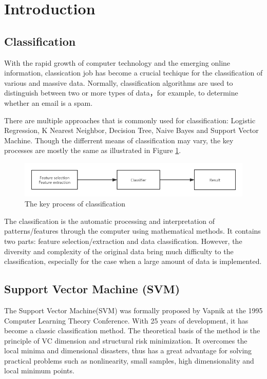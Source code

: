 \section{Introduction}

\subsection{Classification}
With the rapid growth of computer technology and the emerging online information, classication job has become a crucial techique for the classification of various and massive data. Normally, classification algorithms are used to distinguish between two or more types of data，for example, to determine whether an email is a spam. 

There are multiple approaches that is commonly used for classification: Logistic Regression, K Nearest Neighbor, Decision Tree, Naive Bayes and Support Vector Machine. Though the differrent means of classification may vary, the key processes are mostly the same as illustrated in Figure \ref{fig:The key process of classfication}.

\begin{figure}[h!]
    \centering
    \includegraphics[width=\textwidth]{figures/The key process of classfication.png}
    \caption{The key process of classification}
    \label{fig:The key process of classfication}
\end{figure}


The classification is the automatic processing and interpretation of patterns/features through the computer using mathematical methods. It contains two parts: feature selection/extraction and data classification. However, the diversity and complexity of the original data bring much difficulty to the classification, especially for the case when a large amount of data is implemented.

\subsection{Support Vector Machine (SVM)}
The Support Vector Machine(SVM) was formally proposed by Vapnik at the 1995 Computer Learning Theory Conference. With 25 years of development, it has become a classic classification method. The theoretical basis of the method  is the principle of VC dimension and structural risk minimization. It overcomes the local minima and dimensional disasters, thus has a great advantage for solving practical problems such as nonlinearity, small samples, high dimensionality and local minimum points\cite{xuegong2000introduction}.


